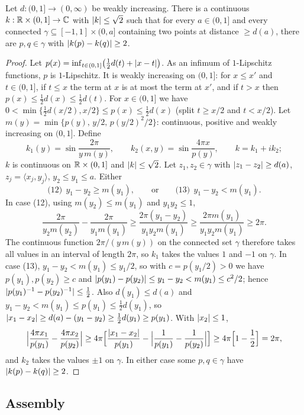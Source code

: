 \begin{theorem}\label{thm:construct-C}
Let $d:(0,1]\to(0,\infty)$ be weakly increasing. There is a continuous $k:\mathbb{R}\times(0,1]\to\mathbb{C}$ with $\lvert k\rvert\le\sqrt2$ such
that for every $a\in(0,1]$ and every connected $\gamma\subseteq[-1,1]\times(0,a]$ containing two points at distance
$\ge d(a)$, there are $p,q\in\gamma$ with $\lvert k(p)-k(q)\rvert\ge2$.
\end{theorem}
\begin{proof}
Let $p(x)=\inf_{t\in(0,1]}\bigl(\frac12d(t)+\lvert x-t\rvert\bigr)$. As an infimum of $1$-Lipschitz functions, $p$ is
$1$-Lipschitz. It is weakly increasing on $(0,1]$: for $x\le x'$ and $t\in(0,1]$, if $t\le x$ the term at $x$ is at most
the term at $x'$, and if $t>x$ then $p(x)\le\frac12d(x)\le\frac12d(t)$. For $x\in(0,1]$ we have
$0<\min\{\frac12d(x/2),x/2\}\le p(x)\le\frac12d(x)$ (split $t\ge x/2$ and $t<x/2$). Let
$m(y)=\min\{p(y),\,y/2,\,p(y/2)^2/2\}$: continuous, positive and weakly increasing on $(0,1]$. Define
\[
k_1(y)=\sin\frac{2\pi}{y\,m(y)},\qquad k_2(x,y)=\sin\frac{4\pi x}{p(y)},\qquad k=k_1+ik_2 ;
\]
$k$ is continuous on $\mathbb{R}\times(0,1]$ and $\lvert k\rvert\le\sqrt2$.
Let $z_1,z_2\in\gamma$ with $\lvert z_1-z_2\rvert\ge d(a)$, $z_j=\langle x_j,y_j\rangle$, $y_2\le y_1\le a$. Either
\[
\text{(12)}\ \ y_1-y_2\ge m(y_1),\qquad\text{or}\qquad\text{(13)}\ \ y_1-y_2<m(y_1).
\]
In case (12), using $m(y_2)\le m(y_1)$ and $y_1y_2\le1$,
\[
\frac{2\pi}{y_2m(y_2)}-\frac{2\pi}{y_1m(y_1)}\ge\frac{2\pi(y_1-y_2)}{y_1y_2m(y_1)}\ge\frac{2\pi m(y_1)}{y_1y_2m(y_1)}\ge2\pi .
\]
The continuous function $2\pi/(y\,m(y))$ on the connected set $\gamma$ therefore takes all values in an interval of length
$2\pi$, so $k_1$ takes the values $1$ and $-1$ on $\gamma$. In case (13), $y_1-y_2<m(y_1)\le y_1/2$, so with
$c=p(y_1/2)>0$ we have $p(y_1),p(y_2)\ge c$ and $\lvert p(y_1)-p(y_2)\rvert\le y_1-y_2<m(y_1)\le c^2/2$; hence
$\lvert p(y_1)^{-1}-p(y_2)^{-1}\rvert\le\frac12$. Also $d(y_1)\le d(a)$ and $y_1-y_2<m(y_1)\le p(y_1)\le\frac12d(y_1)$, so
$\lvert x_1-x_2\rvert\ge d(a)-(y_1-y_2)\ge\frac12d(y_1)\ge p(y_1)$. With $\lvert x_2\rvert\le1$,
\[
\Bigl|\frac{4\pi x_1}{p(y_1)}-\frac{4\pi x_2}{p(y_2)}\Bigr|\ge4\pi\Bigl[\frac{\lvert x_1-x_2\rvert}{p(y_1)}-\Bigl|\frac1{p(y_1)}-\frac1{p(y_2)}\Bigr|\Bigr]
\ge4\pi\Bigl[1-\frac12\Bigr]=2\pi,
\]
and $k_2$ takes the values $\pm1$ on $\gamma$. In either case some $p,q\in\gamma$ have $\lvert k(p)-k(q)\rvert\ge2$.
\end{proof}

\subsection{Assembly}

